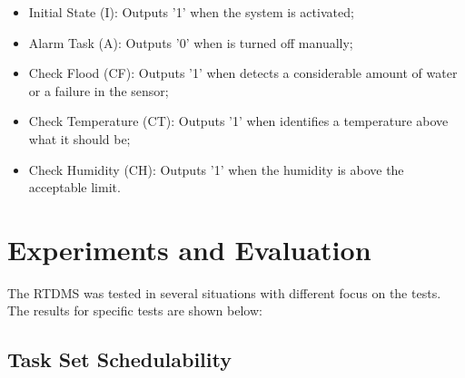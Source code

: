 \documentclass[12pt]{article}
\begin{document}
\begin{itemize}
 \item Initial State (I): Outputs '1' when the system is activated;
 \item Alarm Task (A): Outputs '0' when is turned off manually;
 \item Check Flood (CF): Outputs '1' when detects a considerable amount of water or a failure in the sensor;
 \item Check Temperature (CT): Outputs '1' when identifies a temperature above what it should be;
 \item Check Humidity (CH): Outputs '1' when the humidity is above the acceptable limit.
\end{itemize}

\iffalse
\subsection{Hardware Requirements}

The prototype implementation of RTDMS consisted in the following hardware equipments:
\begin{itemize}
 \item 1x - Arduino Uno
 \item 3x - Temperature and humidity sensors
 \item 1x - Rain sensor
 \item 1x - Buzzer
 \item 1x - Potentiometer
\end{itemize}


[negocio do arduino]
\fi

\section{Experiments and Evaluation}

The RTDMS was tested in several situations with different focus on the tests. The results for specific tests are shown below:

\subsection{Task Set Schedulability}
\end{document}
